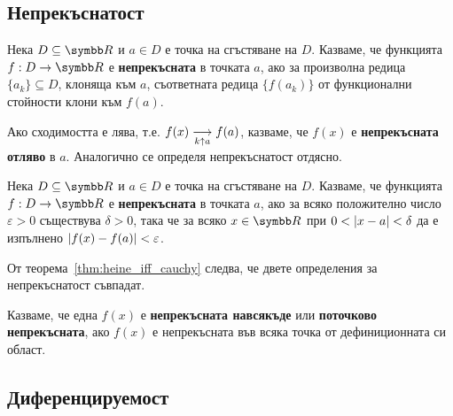 \documentclass[numbers=endperiod, bibliography=totocnumbered]{scrartcl}
\begin{document}
\subsection{Непрекъснатост}

\begin{definition}
  Нека \( D \subseteq \R \) и \( a \in D \) е точка на сгъстяване на \( D \). Казваме, че функцията \( f: D \to \R \) е \textbf{непрекъсната} в точката \( a \), ако за произволна редица \( \{ a_k \} \subseteq D \), клоняща към \( a \), съответната редица \( \{ f(a_k) \} \) от функционални стойности клони към \( f(a) \).

  Ако сходимостта е лява, т.е. \( f(x) \Conv[k \uparrow a]{} f(a) \), казваме, че \( f(x) \) е \textbf{непрекъсната отляво} в \( a \). Аналогично се определя непрекъснатост отдясно.
\end{definition}

\begin{definition}
  Нека \( D \subseteq \R \) и \( a \in D \) е точка на сгъстяване на \( D \). Казваме, че функцията \( f: D \to \R \) е \textbf{непрекъсната} в точката \( a \), ако за всяко положително число \( \varepsilon > 0 \) съществува \( \delta > 0 \), така че за всяко \( x \in \R \) при \( 0 < \Abs{x - a} < \delta \) да е изпълнено \( \Abs{f(x) - f(a)} < \varepsilon \).
\end{definition}

\begin{remark}
  От теорема~\ref{thm:heine_iff_cauchy} следва, че двете определения за непрекъснатост съвпадат.
\end{remark}

\begin{definition}
  Казваме, че една \( f(x) \) е \textbf{непрекъсната навсякъде} или \textbf{поточково непрекъсната}, ако \( f(x) \) е непрекъсната във всяка точка от дефиниционната си област.
\end{definition}

\subsection{Диференцируемост}
\end{document}
